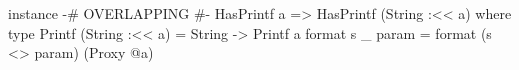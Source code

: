 \begin{code}
instance {-# OVERLAPPING #-} HasPrintf a
    => HasPrintf (String :<< a) where
  type Printf (String :<< a) = String -> Printf a
  format s _ param = format (s <> param) (Proxy @a)
\end{code}
